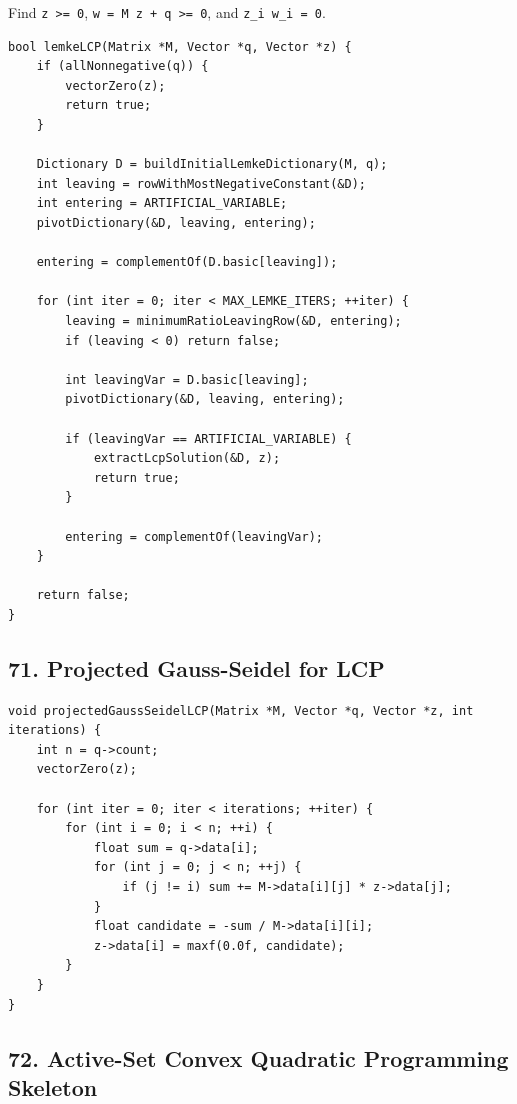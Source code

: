 \documentclass[10pt,letterpaper]{article}
\begin{document}
Find \texttt{z >= 0}, \texttt{w = M z + q >= 0}, and \texttt{z\_i w\_i = 0}.

\begin{verbatim}
bool lemkeLCP(Matrix *M, Vector *q, Vector *z) {
    if (allNonnegative(q)) {
        vectorZero(z);
        return true;
    }

    Dictionary D = buildInitialLemkeDictionary(M, q);
    int leaving = rowWithMostNegativeConstant(&D);
    int entering = ARTIFICIAL_VARIABLE;
    pivotDictionary(&D, leaving, entering);

    entering = complementOf(D.basic[leaving]);

    for (int iter = 0; iter < MAX_LEMKE_ITERS; ++iter) {
        leaving = minimumRatioLeavingRow(&D, entering);
        if (leaving < 0) return false;

        int leavingVar = D.basic[leaving];
        pivotDictionary(&D, leaving, entering);

        if (leavingVar == ARTIFICIAL_VARIABLE) {
            extractLcpSolution(&D, z);
            return true;
        }

        entering = complementOf(leavingVar);
    }

    return false;
}
\end{verbatim}

\subsection*{71. Projected Gauss-Seidel for LCP}

\begin{verbatim}
void projectedGaussSeidelLCP(Matrix *M, Vector *q, Vector *z, int iterations) {
    int n = q->count;
    vectorZero(z);

    for (int iter = 0; iter < iterations; ++iter) {
        for (int i = 0; i < n; ++i) {
            float sum = q->data[i];
            for (int j = 0; j < n; ++j) {
                if (j != i) sum += M->data[i][j] * z->data[j];
            }
            float candidate = -sum / M->data[i][i];
            z->data[i] = maxf(0.0f, candidate);
        }
    }
}
\end{verbatim}

\subsection*{72. Active-Set Convex Quadratic Programming Skeleton}
\end{document}
